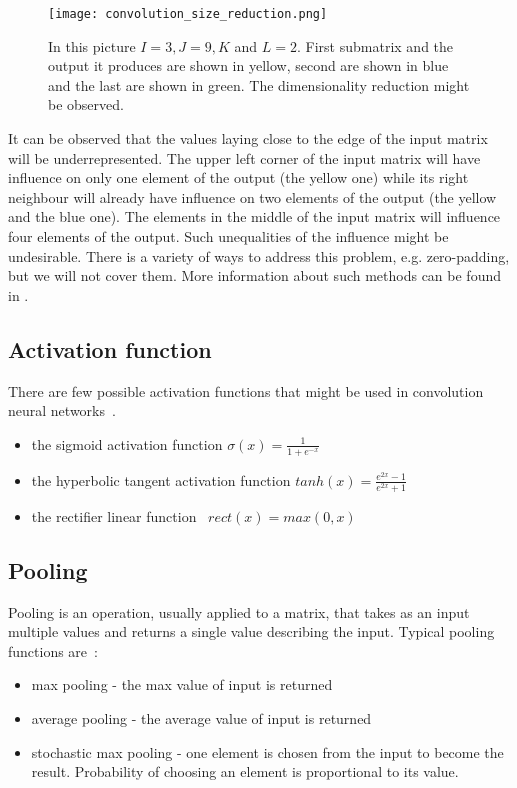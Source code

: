 \documentclass[a4paper,10pt]{report}
\begin{document}
	  
	  \begin{figure}[h!]
	    \centering
	    \texttt{[image: convolution\_size\_reduction.png]}
	    \caption{In this picture $I = 3, J = 9, K$ and $L = 2$. First submatrix and the output it produces are shown in yellow, second are shown in blue and the last are shown in green. The dimensionality reduction might be observed.}
	    \label{fig:convolution_size_reduction}
	  \end{figure} 
	  
	  It can be observed that the values laying close to the edge of the input matrix will be underrepresented. The upper left corner of the input matrix will have influence on only one element of the output (the yellow one) while its right neighbour will already have influence on two elements of the output (the yellow and the blue one). The elements in the middle of the input matrix will influence four elements of the output. Such unequalities of the influence might be undesirable. There is a variety of ways to address this problem, e.g. zero-padding, but we will not cover them. More information about such methods can be found in \cite{Bengio}. 
	  
	\subsection{Activation function}\label{sec:ACTIVATION_FUNCTIONS}
	  There are few possible activation functions that might be used in convolution neural networks~\cite{DUTCH}.
	  \begin{itemize}
	   \item the sigmoid activation function $\sigma(x) = \frac{1}{1 + e^{-x}}$
	   \item the hyperbolic tangent activation function $tanh(x) = \frac{e^{2x} - 1}{e^{2x} + 1}$
	   \item the rectifier linear function~\cite{GLOROT_BENGIO} $rect(x) = max(0,x)$
	  \end{itemize}

	
	\subsection{Pooling}
	  Pooling is an operation, usually applied to a matrix, that takes as an input multiple values and returns a single value describing the input. Typical pooling functions are~\cite{DUTCH}:
	  \begin{itemize}
	    \item max pooling - the max value of input is returned
	    \item average pooling - the average value of input is returned
	    \item stochastic max pooling - one element is chosen from the input to become the result. Probability of choosing an element is proportional to its value.~\cite{ZEILER} 
	  \end{itemize}
	  
\end{document}
